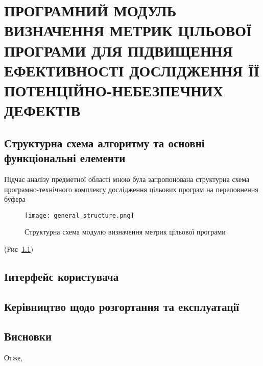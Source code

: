 \chapter{ПРОГРАМНИЙ МОДУЛЬ ВИЗНАЧЕННЯ МЕТРИК ЦІЛЬОВОЇ ПРОГРАМИ ДЛЯ ПІДВИЩЕННЯ ЕФЕКТИВНОСТІ ДОСЛІДЖЕННЯ ЇЇ ПОТЕНЦІЙНО-НЕБЕЗПЕЧНИХ ДЕФЕКТІВ}
\label{3section::doc}\label{3section:id1}

\section{Структурна схема алгоритму та основні функціональні елементи}
\label{3section:id2}
Підчас аналізу предметної області мною була запропонована структурна схема програмно-технічного комплексу дослідження цільових програм на переповнення буфера 
\begin{figure} [h]
    \centering
    \texttt{[image: general\_structure.png]}
    \caption{Структурна схема модулю визначення метрик цільової програми}
    \label{fig:general_structure}
\end{figure}
(Рис \,\ref{fig:general_structure})

\section{Інтерфейс користувача}
\label{3section:id3}

\section{Керівництво щодо розгортання та експлуатації}
\label{3section:id4}

\section*{Висновки}
Отже,
